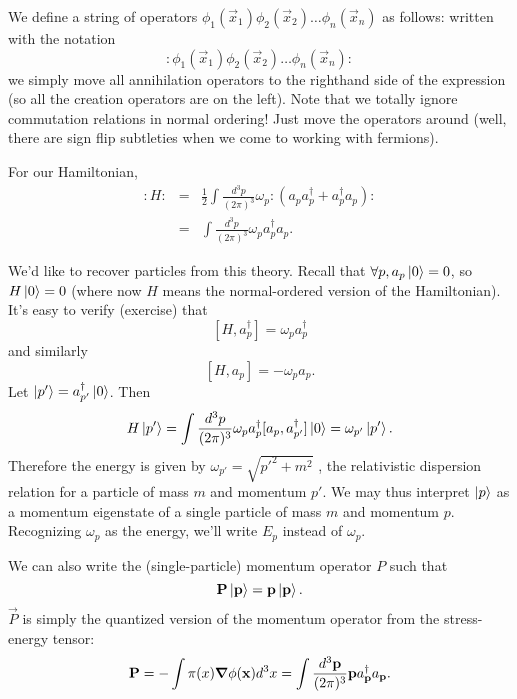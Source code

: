 \begin{defn}
We define a  string of operators $\phi_1(\vec x_1)\phi_2 (\vec x_2)\ldots \phi_n (\vec x_n)$ as follows:
written with the notation
$$: \phi_1(\vec x_1)\phi_2 (\vec x_2)\ldots \phi_n (\vec x_n):$$
we simply move all annihilation operators to the righthand side of the expression (so all the creation operators are on the left). Note that we totally ignore commutation relations in normal ordering! Just move the operators around (well, there are sign flip subtleties when we come to working with fermions).

\end{defn}
\begin{exm}
For our Hamiltonian,
\begin{eqnarray*}
:H:&=& \frac{1}{2} \int \frac{d^3p}{(2\pi)^3} \omega_p :(a_p a_p^\dagger + a_p^\dagger a_p):\\
&=&\int \frac{d^3p}{(2\pi)^3} \omega_p a_p^\dagger a_p.
\end{eqnarray*}
\end{exm}

We'd like to recover particles from this theory. Recall that $\forall p, a_p\left| 0 \right>=0$, so $H\left| 0 \right>=0$ (where now $H$ means the normal-ordered version of the Hamiltonian). It's easy to verify (exercise) that
$$[H,a_p^\dagger] =\omega_p a_p^\dagger$$
and similarly
$$[H,a_p]=-\omega_p a_p.$$
Let $\left| p' \right>=a^\dagger_{p'}\left| 0 \right>$. Then
$$H\left| p' \right>=\int \frac{d^3 p}{(2\pi)^3} \omega_p a_p^\dagger [a_p, a_{p'}^\dagger]\left| 0 \right>=\omega_{p'}\left| p' \right>.$$
Therefore the energy is given by $\omega_{p'}=\sqrt{{p'}^2+m^2}$ , the relativistic dispersion relation for a particle of mass $m$ and momentum $p'$. We may thus interpret $\left| p \right>$ as a momentum eigenstate of a single particle of mass $m$ and momentum $p$. Recognizing $\omega_p$ as the energy, we'll write $E_p$ instead of $\omega_p$.

We can also write the (single-particle) momentum operator $P$ such that
$$\boldsymbol{\mathbf{P}}\left| \boldsymbol{\mathbf{p}} \right>=\boldsymbol{\mathbf{p}}\left| \boldsymbol{\mathbf{p}} \right>.$$
$\vec P$ is simply the quantized version of the momentum operator from the stress-energy tensor:
$$\boldsymbol{\mathbf{P}} =-\int \pi(x) \mbox{\boldmath$ \nabla $} \phi(\boldsymbol{\mathbf{x}})d^3 x=\int \frac{d^3 \boldsymbol{\mathbf{p}}}{(2\pi)^3} \boldsymbol{\mathbf{p}} a^\dagger_{\boldsymbol{\mathbf{p}}}a _{\boldsymbol{\mathbf{p}}}.$$
